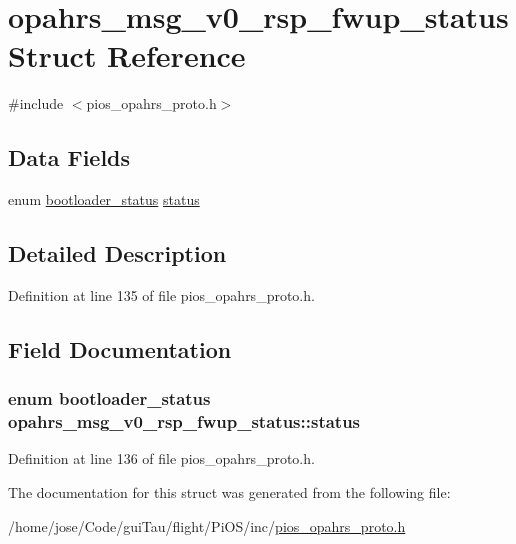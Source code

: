 \hypertarget{structopahrs__msg__v0__rsp__fwup__status}{\section{opahrs\-\_\-msg\-\_\-v0\-\_\-rsp\-\_\-fwup\-\_\-status Struct Reference}
\label{structopahrs__msg__v0__rsp__fwup__status}
}


{\ttfamily \#include $<$pios\-\_\-opahrs\-\_\-proto.\-h$>$}

\subsection*{Data Fields}
\begin{DoxyCompactItemize}
\item 
enum \hyperlink{group___p_i_o_s___o_p_a_h_r_s_gacd1b942d184c2de630e3264073bbe4ac}{bootloader\-\_\-status} \hyperlink{structopahrs__msg__v0__rsp__fwup__status_a52cc898cbb63a6e519be910122e6f4a3}{status}
\end{DoxyCompactItemize}


\subsection{Detailed Description}


Definition at line 135 of file pios\-\_\-opahrs\-\_\-proto.\-h.



\subsection{Field Documentation}
\hypertarget{structopahrs__msg__v0__rsp__fwup__status_a52cc898cbb63a6e519be910122e6f4a3}{
\subsubsection[{status}]{\setlength{\rightskip}{0pt plus 5cm}enum {\bf bootloader\-\_\-status} opahrs\-\_\-msg\-\_\-v0\-\_\-rsp\-\_\-fwup\-\_\-status\-::status}}\label{structopahrs__msg__v0__rsp__fwup__status_a52cc898cbb63a6e519be910122e6f4a3}


Definition at line 136 of file pios\-\_\-opahrs\-\_\-proto.\-h.



The documentation for this struct was generated from the following file\-:\begin{DoxyCompactItemize}
\item 
/home/jose/\-Code/gui\-Tau/flight/\-Pi\-O\-S/inc/\hyperlink{pios__opahrs__proto_8h}{pios\-\_\-opahrs\-\_\-proto.\-h}\end{DoxyCompactItemize}
